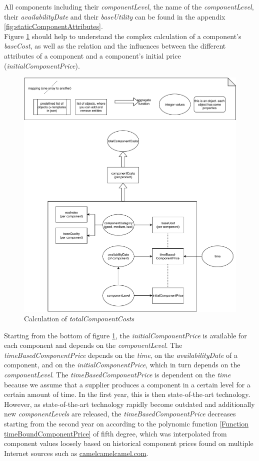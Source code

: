 All components including their \textit{componentLevel}, the name of the \textit{componentLevel}, their \textit{availabilityDate} and their \textit{baseUtility} can be found in the appendix \ref{fig:staticComponentAttributes}.\\
Figure \ref{img:totalComponentCosts} should help to understand the complex calculation of a component's \textit{baseCost}, as well as the relation and the influences between the different attributes of a component and a component’s initial price (\textit{initialComponentPrice}).\\
\begin{figure} [!htbp]
	\centering
	\includegraphics[width=11.5cm]{images/totalComponentCosts.pdf}
	\caption{Calculation of \textit{totalComponentCosts}}
	\label{img:totalComponentCosts}
\end{figure}
Starting from the bottom of figure \ref{img:totalComponentCosts}, the \textit{initialComponentPrice} is available for each component and depends on the \textit{componentLevel}.
The \textit{timeBasedComponentPrice} depends on the \textit{time}, on the \textit{availabilityDate} of a component, and on the \textit{initialComponentPrice}, which in turn depends on the \textit{componentLevel}.
The \textit{timeBasedComponentPrice} is dependent on the \textit{time} because we assume that a supplier produces a component in a certain level for a certain amount of time. In the first year, this is then state-of-the-art technology. However, as state-of-the-art technology rapidly become outdated and additionally new \textit{componentLevels} are released, the \textit{timeBasedComponentPrice} decreases starting from the second year on according to the polynomic function \ref{Function timeBoundComponentPrice} of fifth degree, which was interpolated from component values loosely based on historical component prices found on multiple Internet sources such as \href{https://camelcamelcamel.com}{camelcamelcamel.com}.
